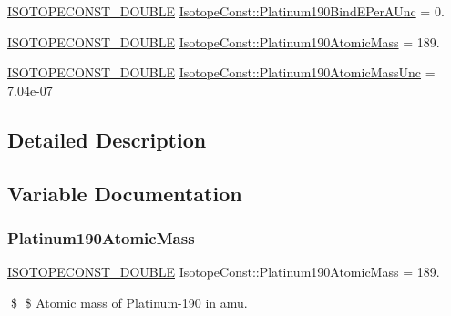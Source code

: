 \begin{DoxyCompactItemize}
\mbox{\hyperlink{group___isotope_const-_macros_ga8f45a7272ce02c0b4c65c44636ed719a}{I\+S\+O\+T\+O\+P\+E\+C\+O\+N\+S\+T\+\_\+\+D\+O\+U\+B\+LE}} \mbox{\hyperlink{group___isotope_const-_platinum-_pt190_gad87e86fe5b3b5983e740a7e38af2d0ab}{Isotope\+Const\+::\+Platinum190\+Bind\+E\+Per\+A\+Unc}} = 0.
\item 
\mbox{\hyperlink{group___isotope_const-_macros_ga8f45a7272ce02c0b4c65c44636ed719a}{I\+S\+O\+T\+O\+P\+E\+C\+O\+N\+S\+T\+\_\+\+D\+O\+U\+B\+LE}} \mbox{\hyperlink{group___isotope_const-_platinum-_pt190_ga9f06755a463ff632d0e56b4adb0f6774}{Isotope\+Const\+::\+Platinum190\+Atomic\+Mass}} = 189.
\item 
\mbox{\hyperlink{group___isotope_const-_macros_ga8f45a7272ce02c0b4c65c44636ed719a}{I\+S\+O\+T\+O\+P\+E\+C\+O\+N\+S\+T\+\_\+\+D\+O\+U\+B\+LE}} \mbox{\hyperlink{group___isotope_const-_platinum-_pt190_ga80e068a00c888d071bc0fa39a8befdc8}{Isotope\+Const\+::\+Platinum190\+Atomic\+Mass\+Unc}} = 7.\+04e-\/07
\end{DoxyCompactItemize}


\subsection{Detailed Description}


\subsection{Variable Documentation}
\mbox{\label{group___isotope_const-_platinum-_pt190_ga9f06755a463ff632d0e56b4adb0f6774}} 
\subsubsection{\texorpdfstring{Platinum190\+Atomic\+Mass}{Platinum190AtomicMass}}
{\footnotesize\ttfamily \mbox{\hyperlink{group___isotope_const-_macros_ga8f45a7272ce02c0b4c65c44636ed719a}{I\+S\+O\+T\+O\+P\+E\+C\+O\+N\+S\+T\+\_\+\+D\+O\+U\+B\+LE}} Isotope\+Const\+::\+Platinum190\+Atomic\+Mass = 189.}

\$ \$ Atomic mass of Platinum-\/190 in amu. \mbox{\label{group___isotope_const-_platinum-_pt190_ga80e068a00c888d071bc0fa39a8befdc8}} 
